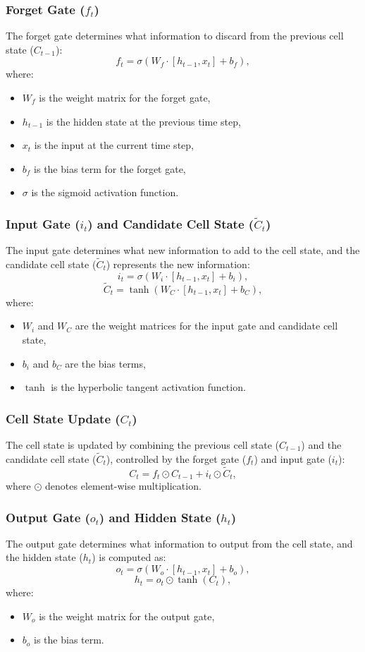 \begin{notechapter}
\subsubsection{Forget Gate (\(f_t\))}
The forget gate determines what information to discard from the
previous cell state (\(C_{t-1}\)):
\[
f_t = \sigma(W_f \cdot [h_{t-1}, x_t] + b_f),
\]
where:
\begin{itemize}
    \item \(W_f\) is the weight matrix for the forget gate,
    \item \(h_{t-1}\) is the hidden state at the previous time step,
    \item \(x_t\) is the input at the current time step,
    \item \(b_f\) is the bias term for the forget gate,
    \item \(\sigma\) is the sigmoid activation function.
\end{itemize}

\subsubsection{Input Gate (\(i_t\)) and Candidate Cell State (\(\tilde{C}_t\))}
The input gate determines what new information to add to the cell
state, and the candidate cell state (\(\tilde{C}_t\)) represents
the new information:
\[
i_t = \sigma(W_i \cdot [h_{t-1}, x_t] + b_i),
\]
\[
\tilde{C}_t = \tanh(W_C \cdot [h_{t-1}, x_t] + b_C),
\]
where:
\begin{itemize}
    \item \(W_i\) and \(W_C\) are the weight matrices for the input
    gate and candidate cell state,
    \item \(b_i\) and \(b_C\) are the bias terms,
    \item \(\tanh\) is the hyperbolic tangent activation function.
\end{itemize}

\subsubsection{Cell State Update (\(C_t\))}
The cell state is updated by combining the previous cell state
(\(C_{t-1}\)) and the candidate cell state (\(\tilde{C}_t\)),
controlled by the forget gate (\(f_t\)) and input gate (\(i_t\)):
\[
C_t = f_t \odot C_{t-1} + i_t \odot \tilde{C}_t,
\]
where \(\odot\) denotes element-wise multiplication.

\subsubsection{Output Gate (\(o_t\)) and Hidden State (\(h_t\))}
The output gate determines what information to output from the cell
state, and the hidden state (\(h_t\)) is computed as:
\[
o_t = \sigma(W_o \cdot [h_{t-1}, x_t] + b_o),
\]
\[
h_t = o_t \odot \tanh(C_t),
\]
where:
\begin{itemize}
    \item \(W_o\) is the weight matrix for the output gate,
    \item \(b_o\) is the bias term.
\end{itemize}


\end{notechapter}
